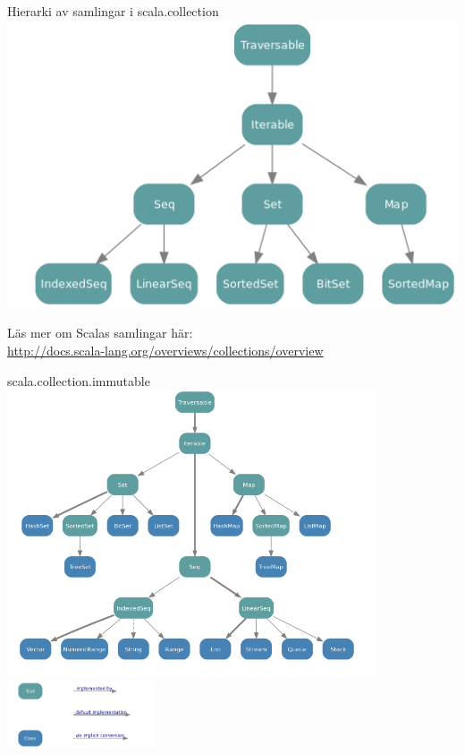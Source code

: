 \fi


\begin{Slide}{Hierarki av samlingar i scala.collection}
\includegraphics[width=1.0\textwidth]{../img/collection/collection-traits}
\end{Slide}

\ifkompendium
\noindent Läs mer om Scalas samlingar här: \\ 
\url{http://docs.scala-lang.org/overviews/collections/overview}
\else\fi

\ifkompendium\else

\begin{Slide}{scala.collection.immutable}
\includegraphics[width=0.82\textwidth]{../img/collection/collection-immutable}
\includegraphics[width=0.33\textwidth]{../img/collection/collection-legend}
\end{Slide}

